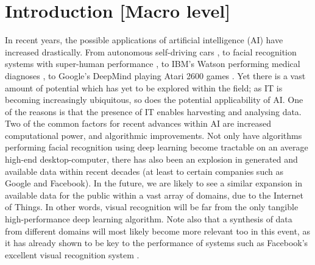 
\chapter{Introduction [Macro level]}\label{chpt:intro}

In recent years, the possible applications of artificial intelligence (AI) have increased drastically. From autonomous self-driving cars \citep{Urmson2009}, to facial recognition systems with super-human performance \citep{Sun2014}, to IBM's Watson performing medical diagnoses \citep{Wagle2013}, to Google's DeepMind playing Atari 2600 games \citep{Mnih2015}. Yet there is a vast amount of potential which has yet to be explored within the field; as IT is becoming increasingly ubiquitous, so does the potential applicability of AI. One of the reasons is that the presence of IT enables harvesting and analysing data. Two of the common factors for recent advances within AI are increased computational power, and algorithmic improvements. Not only have algorithms performing facial recognition using deep learning become tractable on an average high-end desktop-computer, there has also been an explosion in generated and available data within recent decades (at least to certain companies such as Google and Facebook). In the future, we are likely to see a similar expansion in available data for the public within a vast array of domains, due to the Internet of Things. In other words, visual recognition will be far from the only tangible high-performance deep learning algorithm. Note also that a synthesis of data from different domains will most likely become more relevant too in this event, as it has already shown to be key to the performance of systems such as Facebook's excellent visual recognition system \citep{}.
\\

